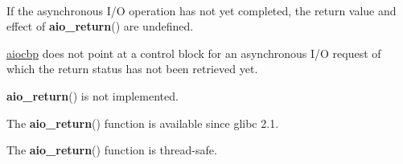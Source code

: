 \documentclass[]{article}
\let\realtextbf=\textbf
\renewcommand{\textbf}[1]{\textcolor{boldcolor}{\realtextbf{#1}}}
\renewcommand{\emph}[1]{\underline{#1}}
\begin{document}
~

If the asynchronous I/O operation has not yet completed, the return
value and effect of \textbf{aio\_return}() are undefined.


\begin{description}
\itemsep1pt\parskip0pt
\item[\textbf{EINVAL}]
\emph{aiocbp} does not point at a control block for an asynchronous I/O
request of which the return status has not been retrieved yet.
\end{description}

\begin{description}
\itemsep1pt\parskip0pt
\item[\textbf{ENOSYS}]
\textbf{aio\_return}() is not implemented.
\end{description}


The \textbf{aio\_return}() function is available since glibc 2.1.



The \textbf{aio\_return}() function is thread-safe.

\end{document}
